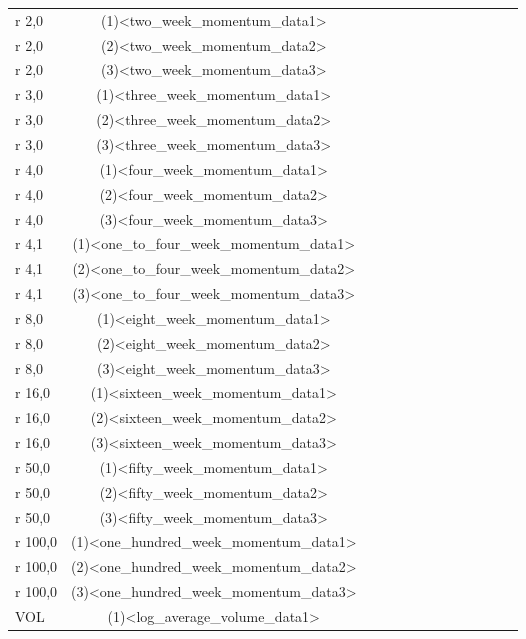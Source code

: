 \documentclass{article}
\begin{document}
\begin{center}
\begin{tabular}{lcccccccccccr}
            r 2,0 & (1)<two_week_momentum_data1>
            \\
            r 2,0 & (2)<two_week_momentum_data2>
            \\
            r 2,0 & (3)<two_week_momentum_data3>
            \\
            r 3,0 & (1)<three_week_momentum_data1>
            \\
            r 3,0 & (2)<three_week_momentum_data2>
            \\
            r 3,0 & (3)<three_week_momentum_data3>
            \\
            r 4,0 & (1)<four_week_momentum_data1>
            \\
            r 4,0 & (2)<four_week_momentum_data2>
            \\
            r 4,0 & (3)<four_week_momentum_data3>
            \\
            r 4,1 & (1)<one_to_four_week_momentum_data1>
            \\
            r 4,1 & (2)<one_to_four_week_momentum_data2>
            \\
            r 4,1 & (3)<one_to_four_week_momentum_data3>
            \\
            r 8,0 & (1)<eight_week_momentum_data1>
            \\
            r 8,0 & (2)<eight_week_momentum_data2>
            \\
            r 8,0 & (3)<eight_week_momentum_data3>
            \\
            r 16,0 & (1)<sixteen_week_momentum_data1>
            \\
            r 16,0 & (2)<sixteen_week_momentum_data2>
            \\
            r 16,0 & (3)<sixteen_week_momentum_data3>
            \\
            r 50,0 & (1)<fifty_week_momentum_data1>
            \\
            r 50,0 & (2)<fifty_week_momentum_data2>
            \\
            r 50,0 & (3)<fifty_week_momentum_data3>
            \\
            r 100,0 & (1)<one_hundred_week_momentum_data1>
            \\
            r 100,0 & (2)<one_hundred_week_momentum_data2>
            \\
            r 100,0 & (3)<one_hundred_week_momentum_data3>
            \\
            VOL & (1)<log_average_volume_data1>

\end{tabular}
\end{center}
\end{document}
